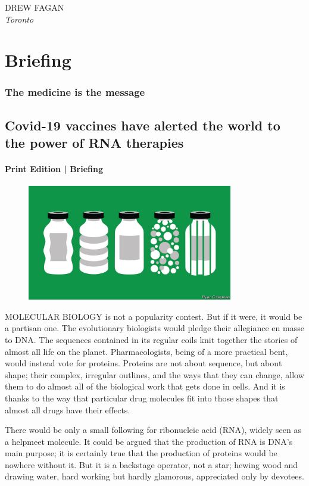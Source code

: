 \documentclass{article}
\begin{document}
DREW FAGAN\\ \emph{Toronto} 
\clearpage
\section{Briefing }
\subsubsection{The medicine is the message }
\subsection{Covid-19 vaccines have alerted the world to the power of RNA therapies }
\paragraph{Print Edition | Briefing  \quad \color{gray}{Mar 27th 2021 }}
\begin{figure}[h]
\centering
\includegraphics[width=0.8\textwidth]{images/20210327_FBD001_0.jpg}
\end{figure}
\lettrine{M}OLECULAR BIOLOGY is not a popularity contest. But if it were, it would be a partisan one. The evolutionary biologists would pledge their allegiance en masse to DNA. The sequences contained in its regular coils knit together the stories of almost all life on the planet. Pharmacologists, being of a more practical bent, would instead vote for proteins. Proteins are not about sequence, but about shape; their complex, irregular outlines, and the ways that they can change, allow them to do almost all of the biological work that gets done in cells. And it is thanks to the way that particular drug molecules fit into those shapes that almost all drugs have their effects. 

There would be only a small following for ribonucleic acid (RNA), widely seen as a helpmeet molecule. It could be argued that the production of RNA is DNA's main purpose; it is certainly true that the production of proteins would be nowhere without it. But it is a backstage operator, not a star; hewing wood and drawing water, hard working but hardly glamorous, appreciated only by devotees. 
\end{document}
